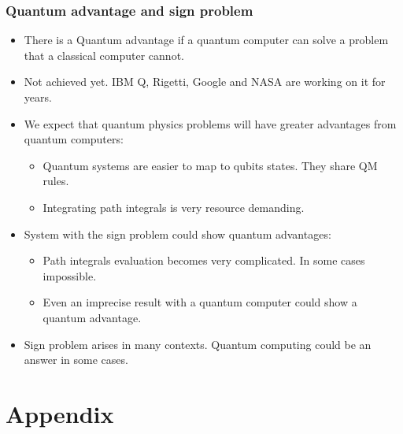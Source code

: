 \documentclass[10pt,t,xcolor=dvipsnames,aspectratio=169]{beamer}
\newlength\leftsidebar
\begin{document}
\begin{frame}
    \frametitle{Quantum advantage and sign problem}
    \begin{itemize}
        \item
            There is a Quantum advantage if a quantum computer can solve a problem that a classical computer cannot.
        \item
            Not achieved yet. IBM Q, Rigetti, Google and NASA are working on it for years.
        \item
            We expect that quantum physics problems will have greater advantages from quantum computers:
            \begin{itemize}
                \item Quantum systems are easier to map to qubits states. They share QM rules.
                \item Integrating path integrals is very resource demanding.
            \end{itemize}
        \item
            System with the sign problem could show quantum advantages:
            \begin{itemize}
                \item Path integrals evaluation becomes very complicated. In some cases impossible.
                \item Even an imprecise result with a quantum computer could show a quantum advantage.
            \end{itemize}
        \item
            Sign problem arises in many contexts. Quantum computing could be an answer in some cases.

    \end{itemize}
\end{frame}


\leftsidebar
{
\begin{frame}[plain,t]
\titlepage
\end{frame}
}
\hoffset=0in %

\section{Appendix}
\end{document}
